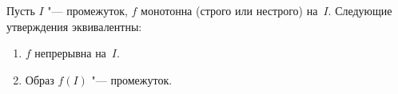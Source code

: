 
Пусть $I$ "--- промежуток, $f$ монотонна (строго или нестрого) на~$I$. Следующие утверждения эквивалентны:

\begin{enumerate}
    \item $f$ непрерывна на~$I$.

    \item Образ $f(I)$ "--- промежуток.
\end{enumerate}
